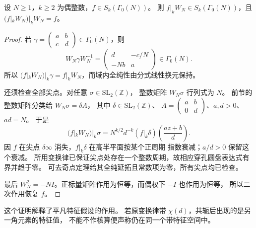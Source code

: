 \begin{proposition}\label{b3:prop:E-fricke-space}
设 \(N\ge1\)，\(k\ge2\) 为偶整数，\(f\in S_k(\Gamma_0(N))\)。
则 \(f|_kW_N\in S_k(\Gamma_0(N))\)，且
\((f|_kW_N)|_kW_N=f\)。
\end{proposition}
\begin{proof}
若 \(\gamma=\left(\begin{smallmatrix}a&b\\c&d\end{smallmatrix}\right)\in\Gamma_0(N)\)，则
\[
 W_N\gamma W_N^{-1}=\begin{pmatrix}d&-c/N\\-Nb&a\end{pmatrix}\in\Gamma_0(N).
\]
所以 \((f|_kW_N)|_k\gamma=f|_kW_N\)，而域内全纯性由分式线性换元保持。

还须检查全部尖点。对任意 \(\sigma\in\mathrm{SL}_2(\mathbb Z)\)，
整数矩阵 \(W_N\sigma\) 行列式为 \(N\)。
前节的整数矩阵分类给 \(W_N\sigma=\delta A\)，
其中 \(\delta\in\mathrm{SL}_2(\mathbb Z)\)、
\(A=\left(\begin{smallmatrix}a&b\\0&d\end{smallmatrix}\right)\)、\(a,d>0\)、\(ad=N\)。
于是
\[
 (f|_kW_N)|_k\sigma
 =N^{k/2}d^{-k}(f|_k\delta)\left(\frac{az+b}{d}\right).
\]
因 \(f\) 在尖点 \(\delta\infty\) 消失，\(f|_k\delta\) 在高半平面按某个正周期
指数衰减；\(a/d>0\) 保留这个衰减。
所用变换律已保证尖点处存在一个整数周期，故相应穿孔圆盘表达式有界并趋于零。
可去奇点定理给其全纯延拓且常数项为零，所有尖点均已检查。

最后 \(W_N^2=-NI\)。正标量矩阵作用为恒等，而偶权下 \(-I\) 也作用为恒等，
所以二次作用恢复 \(f\)。
\end{proof}
这个证明解释了平凡特征假设的作用。
若原变换律带 \(\chi(d)\)，共轭后出现的是另一角元素的特征值，
不能不作核算便声称仍在同一个带特征空间中。

